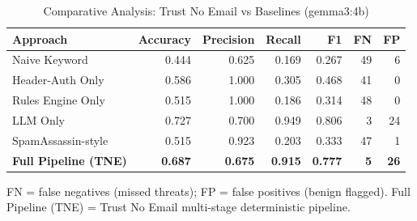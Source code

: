 \begin{table}[h]
\centering
\caption{Comparative Analysis: Trust No Email vs Baselines (gemma3:4b)}
\label{tab:e10_comparative}
\begin{tabular}{l r r r r r r}
\hline
Approach & Accuracy & Precision & Recall & F1 & FN & FP \\
\hline
Naive Keyword & 0.444 & 0.625 & 0.169 & 0.267 & 49 & 6 \\
Header-Auth Only & 0.586 & 1.000 & 0.305 & 0.468 & 41 & 0 \\
Rules Engine Only & 0.515 & 1.000 & 0.186 & 0.314 & 48 & 0 \\
LLM Only & 0.727 & 0.700 & 0.949 & 0.806 & 3 & 24 \\
SpamAssassin-style & 0.515 & 0.923 & 0.203 & 0.333 & 47 & 1 \\
\textbf{Full Pipeline (TNE)} & \textbf{0.687} & \textbf{0.675} & \textbf{0.915} & \textbf{0.777} & \textbf{5} & \textbf{26} \\
\hline
\end{tabular}
\vspace{2mm}
\footnotesize{FN = false negatives (missed threats); FP = false positives (benign flagged). Full Pipeline (TNE) = Trust No Email multi-stage deterministic pipeline.}
\end{table}